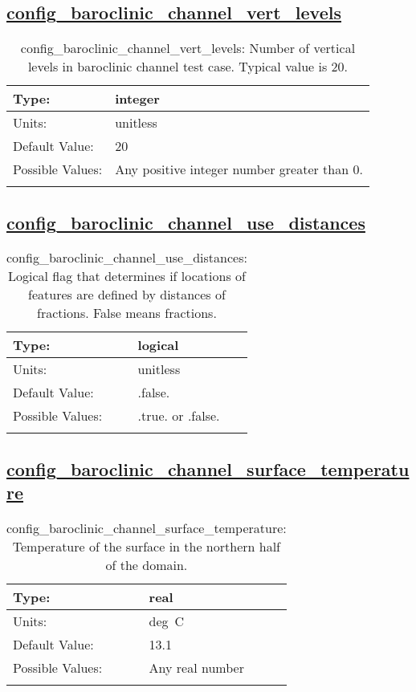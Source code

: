\subsection[config\_baroclinic\_channel\_vert\_levels]{\hyperref[sec:nm_tab_baroclinic_channel]{config\_baroclinic\_channel\_vert\_levels}}
\label{subsec:nm_sec_config_baroclinic_channel_vert_levels}
\begin{center}
\begin{longtable}{| p{2.0in} || p{4.0in} |}
    \hline
    Type: & integer \\
    \hline
    Units: & \si{unitless} \\
    \hline
    Default Value: & 20 \\
    \hline
    Possible Values: & Any positive integer number greater than 0. \\
    \hline
    \caption{config\_baroclinic\_channel\_vert\_levels: Number of vertical levels in baroclinic channel test case. Typical value is 20.}
\end{longtable}
\end{center}
\subsection[config\_baroclinic\_channel\_use\_distances]{\hyperref[sec:nm_tab_baroclinic_channel]{config\_baroclinic\_channel\_use\_distances}}
\label{subsec:nm_sec_config_baroclinic_channel_use_distances}
\begin{center}
\begin{longtable}{| p{2.0in} || p{4.0in} |}
    \hline
    Type: & logical \\
    \hline
    Units: & \si{unitless} \\
    \hline
    Default Value: & .false. \\
    \hline
    Possible Values: & .true. or .false. \\
    \hline
    \caption{config\_baroclinic\_channel\_use\_distances: Logical flag that determines if locations of features are defined by distances of fractions. False means fractions.}
\end{longtable}
\end{center}
\subsection[config\_baroclinic\_channel\_surface\_temperature]{\hyperref[sec:nm_tab_baroclinic_channel]{config\_baroclinic\_channel\_surface\_temperature}}
\label{subsec:nm_sec_config_baroclinic_channel_surface_temperature}
\begin{center}
\begin{longtable}{| p{2.0in} || p{4.0in} |}
    \hline
    Type: & real \\
    \hline
    Units: & \si{deg.C} \\
    \hline
    Default Value: & 13.1 \\
    \hline
    Possible Values: & Any real number \\
    \hline
    \caption{config\_baroclinic\_channel\_surface\_temperature: Temperature of the surface in the northern half of the domain.}
\end{longtable}
\end{center}
